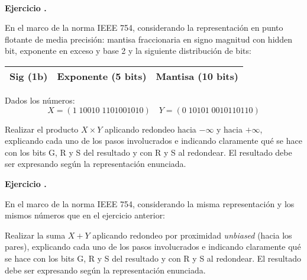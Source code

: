 \documentclass[12pt,a4paper]{article}
\newcounter{ctej}
\newcommand{\ejercicio}{\vspace{1em}\noindent\textbf{Ejercicio \arabic{ctej}.} \addtocounter{ctej}{1}}
\begin{document}

\


\ejercicio En el marco de la norma IEEE 754, considerando la representación en punto flotante de media precisión: mantisa fraccionaria en signo magnitud con hidden bit, exponente en exceso y base 2 y la siguiente distribución de bits:
\begin{center}
\begin{tabular}{|c|c|c|}\hline
 Sig (1b) & Exponente (5 bits) & Mantisa (10 bits)\\\hline
\end{tabular}
\end{center}

Dados los números:\quad
$$X = (1\; 10010\; 1101001010) \quad Y = (0\; 10101\; 0010110110)$$


Realizar el producto $X \times Y$ aplicando redondeo hacia $-\infty$ y hacia $+\infty$, explicando cada uno de los pasos involucrados e indicando claramente qué se hace con los bits G, R y S del resultado y con R y S al redondear. El resultado debe ser expresando según la representación enunciada.



%
%
             

\ejercicio En el marco de la norma IEEE 754, considerando la misma representación y los mismos números que en el ejercicio anterior: 

Realizar la suma $X + Y$ aplicando redondeo por proximidad \textit{unbiased} (hacia los pares), explicando cada uno de los pasos involucrados e indicando claramente qué se hace con los bits G, R y S del resultado y con R y S al redondear. El resultado debe ser expresando según la representación enunciada.

%
%
%
%
%
\end{document}
